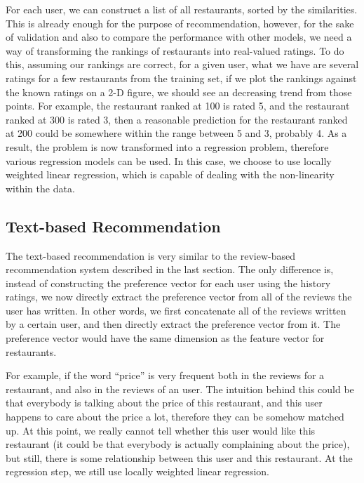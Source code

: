 \documentclass[conference]{IEEEtran}
\begin{document}
\par
For each user, we can construct a list of all restaurants,
sorted by the similarities. This is already enough for the purpose
of recommendation, however, for the sake of validation and also to
compare the performance with other models, we need a way of transforming the
rankings of restaurants into real-valued ratings. To do this, 
assuming our rankings are correct, for a given user,
what we have are several ratings for a few 
restaurants from the training set, if we plot the rankings against the
known ratings on a 2-D figure, 
we should see an decreasing trend from those points. For example, the restaurant
ranked at 100 is rated 5, and the restaurant ranked at 300 is rated 3, then 
a reasonable prediction for the restaurant ranked at 200 could be somewhere
within the range between 5 and 3, probably 4. As a result, the problem is now
transformed into a regression problem, therefore various regression models can be used. In this case, we choose to use locally weighted linear regression, 
which is capable of dealing with the non-linearity within the data.

\subsection{Text-based Recommendation}
The text-based recommendation
is very similar to the review-based recommendation system described in the 
last section. The only difference is, instead of constructing the 
preference vector for each user using the history ratings, we now directly 
extract the preference vector from all of the reviews the user has written. 
In other words, we first concatenate all of the reviews written by a 
certain user, and then directly extract the preference vector from it. 
The preference vector would have the same dimension as the feature vector 
for restaurants. 
\par
For example, if the word ``price'' is very frequent both in the reviews for a restaurant, and also in the reviews of an user. The intuition behind this could
be that everybody is talking about the price of this restaurant, and this user 
happens to care about the price a lot, 
therefore they can be somehow matched up. At 
this point, we really cannot tell whether this user would like this restaurant
(it could be that everybody is actually complaining about the price), but still,
there is some relationship between this user and this restaurant. At the regression step, we still use locally weighted linear regression.
\end{document}
